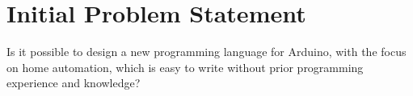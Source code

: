 \chapter{Initial Problem Statement}\label{ch:InitialProblemStatement}
Is it possible to design a new programming language for Arduino, with the focus on home automation, which is easy to write without prior programming experience and knowledge?